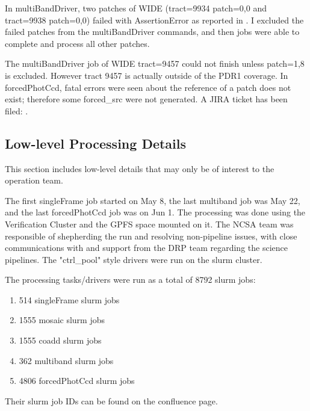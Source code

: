 \documentclass[DM,authoryear,toc]{lsstdoc}
\begin{document}
In multiBandDriver, two patches of WIDE (tract=9934 patch=0,0  and  tract=9938 patch=0,0) failed with AssertionError as reported in . I excluded the failed patches from the multiBandDriver commands, and then jobs were able to complete and process all other patches.

The multiBandDriver job of WIDE tract=9457 could not finish unless patch=1,8 is excluded. However tract 9457 is actually outside of the PDR1 coverage.
In forcedPhotCcd, fatal errors were seen about the reference of a patch does not exist; therefore some forced{\_}src were not generated. A JIRA ticket has been filed: .

\subsection{Low-level Processing Details}

This section includes low-level details that may only be of interest to the operation team.

The first singleFrame job started on May 8, the last multiband job was May 22, and the last forcedPhotCcd job was on Jun 1.  The processing was done using the Verification Cluster and the GPFS space mounted on it. The NCSA team was responsible of shepherding the run and resolving non-pipeline issues, with close communications with and support from the DRP team regarding the science pipelines.  The "ctrl{\_}pool" style drivers were run on the slurm cluster.

The processing tasks/drivers were run as a total of 8792 slurm jobs:
\begin{enumerate}
\item
514 singleFrame slurm jobs
\item
1555 mosaic slurm jobs
\item
1555 coadd slurm jobs
\item
362 multiband slurm jobs
\item
4806 forcedPhotCcd slurm jobs
\end{enumerate}
Their slurm job IDs can be found on the confluence page.
\end{document}
